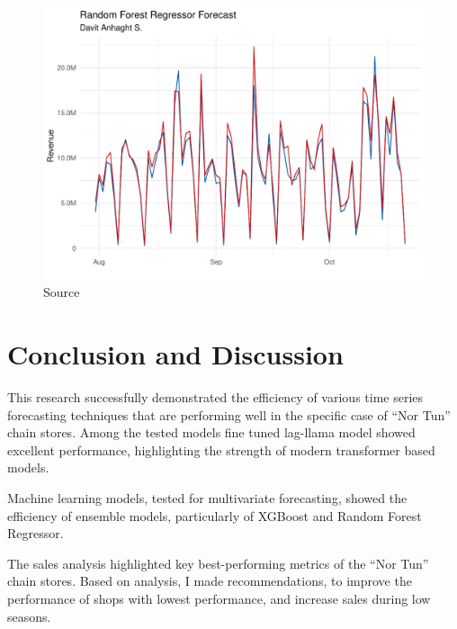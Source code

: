 \documentclass[conference]{IEEEtran}
\begin{document}
\begin{figure}[htbp]
\centering
\includegraphics[width=\columnwidth,keepaspectratio]{./figures/ML_davit_anhaght_prediction.pdf}
\caption{Source \cite{MLforecast}}
\label{fig:RFR_predictions}
\end{figure}


\section{Conclusion and Discussion}
This research successfully demonstrated the efficiency of various time series forecasting techniques that are performing well in the specific case of “Nor Tun” chain stores. Among the tested models fine tuned lag-llama model showed excellent performance, highlighting the strength of modern transformer based models. 

Machine learning models, tested for multivariate forecasting, showed the efficiency of ensemble models, particularly of XGBoost and Random Forest Regressor. 

The sales analysis highlighted key best-performing metrics of the “Nor Tun” chain stores. Based on analysis, I made recommendations, to improve the performance of shops with lowest performance, and increase sales during low seasons. 
\end{document}
